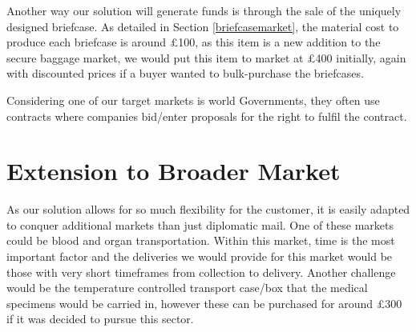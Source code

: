 Another way our solution will generate funds is through the sale of the uniquely designed briefcase. As detailed in Section \ref{briefcasemarket}, the material cost to produce each briefcase is around £100, as this item is a new addition to the secure baggage market, we would put this item to market at £400 initially, again with discounted prices if a buyer wanted to bulk-purchase the briefcases. 

Considering one of our target markets is world Governments, they often use contracts where companies bid/enter proposals for the right to fulfil the contract. 

\section{Extension to Broader Market}
As our solution allows for so much flexibility for the customer, it is easily adapted to conquer additional markets than just diplomatic mail. One of these markets could be blood and organ transportation. Within this market, time is the most important factor and the deliveries we would provide for this market would be those with very short timeframes from collection to delivery. Another challenge would be the temperature controlled transport case/box that the medical specimens would be carried in, however these can be purchased for around £300 \cite{courierCoolers} if it was decided to pursue this sector. 
